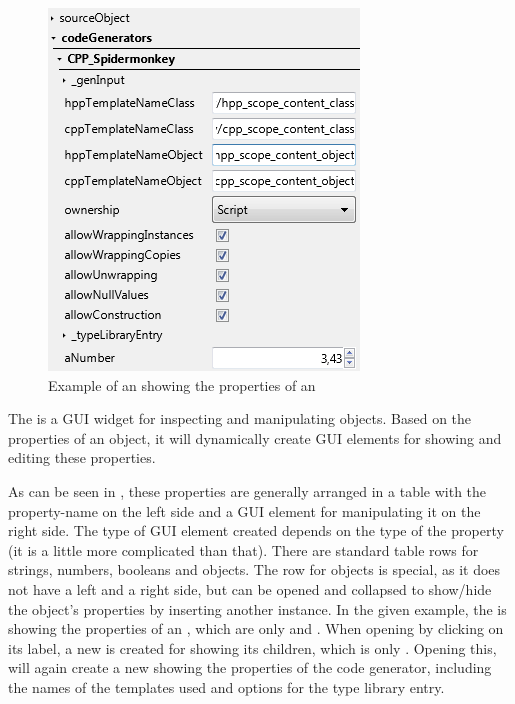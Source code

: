 \begin{figure}
  \vspace{-20pt}
  \begin{center}
    \includegraphics[scale=0.60]{Images/ObjectExplorer.png}
  \end{center}
  \caption{Example of an  showing the properties of an }
  \label{fig:ObjectExplorer}
  \vspace{-15pt}
\end{figure}

The  is a GUI widget for inspecting and manipulating  objects. Based on the properties of an object, it will dynamically create GUI elements for showing and editing these properties.

As can be seen in , these properties are generally arranged in a table with the property-name on the left side and a GUI element for manipulating it on the right side. The type of GUI element created depends on the type of the property (it is a little more complicated than that). There are standard table rows for strings, numbers, booleans and objects. The row for objects is special, as it does not have a left and a right side, but can be opened and collapsed to show/hide the object's properties by inserting another  instance. In the given example, the  is showing the properties of an , which are only  and . When opening  by clicking on its label, a new  is created for showing its children, which is only . Opening this, will again create a new  showing the properties of the  code generator, including the names of the templates used and options for the type library entry.

